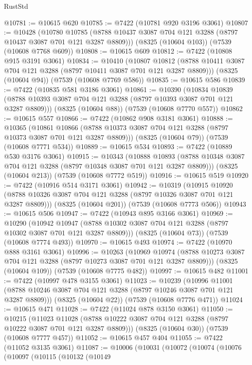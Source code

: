 \begin{lexlean}{RustStd}
\begin{coremodule}
@10781 := @10615 @620
@10785 := @7422 (@10781 @920 @3196 @3061)
@10807 := @10428
    (@10780 @10785 (@8788 @10437 @3087 @704 @121 @3288 (@8797 @10437 @3087 @701 @121 @3287 @8809)))
    (@8325 (@10604 @103))
    (@7539 (@10608 @7768 @609))
@10808 := @10615 @609
@10812 := @7422 (@10808 @915 @3191 @3061)
@10834 := @10410
    (@10807 @10812 (@8788 @10411 @3087 @704 @121 @3288 (@8797 @10411 @3087 @701 @121 @3287 @8809)))
    (@8325 (@10604 @94))
    (@7539 (@10608 @7769 @586))
@10835 := @10615 @586
@10839 := @7422 (@10835 @581 @3186 @3061)
@10861 := @10390
    (@10834 @10839 (@8788 @10393 @3087 @704 @121 @3288 (@8797 @10393 @3087 @701 @121 @3287 @8809)))
    (@8325 (@10604 @88))
    (@7539 (@10608 @7770 @557))
@10862 := @10615 @557
@10866 := @7422 (@10862 @908 @3181 @3061)
@10888 := @10365
    (@10861 @10866 (@8788 @10373 @3087 @704 @121 @3288 (@8797 @10373 @3087 @701 @121 @3287 @8809)))
    (@8325 (@10604 @79))
    (@7539 (@10608 @7771 @534))
@10889 := @10615 @534
@10893 := @7422 (@10889 @530 @3176 @3061)
@10915 := @10343
    (@10888 @10893 (@8788 @10348 @3087 @704 @121 @3288 (@8797 @10348 @3087 @701 @121 @3287 @8809)))
    (@8325 (@10604 @213))
    (@7539 (@10608 @7772 @519))
@10916 := @10615 @519
@10920 := @7422 (@10916 @514 @3171 @3061)
@10942 := @10319
    (@10915 @10920 (@8788 @10326 @3087 @704 @121 @3288 (@8797 @10326 @3087 @701 @121 @3287 @8809)))
    (@8325 (@10604 @201))
    (@7539 (@10608 @7773 @506))
@10943 := @10615 @506
@10947 := @7422 (@10943 @895 @3166 @3061)
@10969 := @10290
    (@10942 @10947 (@8788 @10302 @3087 @704 @121 @3288 (@8797 @10302 @3087 @701 @121 @3287 @8809)))
    (@8325 (@10604 @73))
    (@7539 (@10608 @7774 @493))
@10970 := @10615 @493
@10974 := @7422 (@10970 @888 @3161 @3061)
@10996 := @10263
    (@10969 @10974 (@8788 @10273 @3087 @704 @121 @3288 (@8797 @10273 @3087 @701 @121 @3287 @8809)))
    (@8325 (@10604 @109))
    (@7539 (@10608 @7775 @482))
@10997 := @10615 @482
@11001 := @7422 (@10997 @478 @3155 @3061)
@11023 := @10239
    (@10996 @11001 (@8788 @10246 @3087 @704 @121 @3288 (@8797 @10246 @3087 @701 @121 @3287 @8809)))
    (@8325 (@10604 @22))
    (@7539 (@10608 @7776 @471))
@11024 := @10615 @471
@11028 := @7422 (@11024 @878 @3150 @3061)
@11050 := @10215
    (@11023 @11028 (@8788 @10222 @3087 @704 @121 @3288 (@8797 @10222 @3087 @701 @121 @3287 @8809)))
    (@8325 (@10604 @30))
    (@7539 (@10608 @7777 @457))
@11052 := @10615 @457 @404
@11055 := @7422 (@11052 @3135 @3061)
@11087 := @10006
    (@10031
      (@10072
        (@10074
          (@10076
            (@10097
              (@10115
                (@10132
                  (@10149

\end{coremodule}
\end{lexlean}

